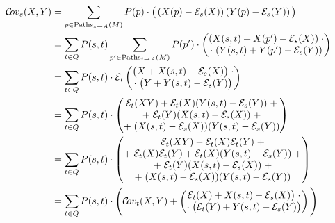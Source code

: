 \documentclass[a4paper]{article}
\theoremstyle{nonumberplain}
\begin{document}
	\begin{align}
	\mathcal{C}\!ov_{s}(X,Y) & = \sum_{p \in \mathrm{Paths}_{s \rightarrow A}(M)}{P(p) \cdot \big(\left(X(p) - \mathcal{E}_{s} (X)\right)\left(Y(p) - \mathcal{E}_{s} (Y)\right)\big)} \\
	& = \sum_{t \in Q}{ P(s,t) \sum_{p' \in \mathrm{Paths}_{t \rightarrow A}(M)}{ P(p') \cdot \begin{pmatrix}
			(X(s,t) + X(p') - \mathcal{E}_{s}(X)) \;\cdot \\
			\cdot \;(Y(s,t) + Y(p') - \mathcal{E}_{s}(Y)) \\
			\end{pmatrix}}} \label{step1} \\
	& = \sum_{t \in Q}{ P(s,t) \cdot \mathcal{E}_{t}\begin{pmatrix}
		\big(X + X(s,t) - \mathcal{E}_{s}(X)\big)\;\cdot \\
		\cdot\;\big(Y + Y(s,t) - \mathcal{E}_{s}(Y)\big) \\
		\end{pmatrix}} \label{step2}\\
	& = \sum_{t \in Q}P(s,t) \cdot \begin{pmatrix}
	\mathcal{E}_{t}(XY) + \mathcal{E}_{t}(X)(Y(s,t) - \mathcal{E}_{s}(Y)) \; + \\
	+\; \mathcal{E}_{t}(Y)(X(s,t) - \mathcal{E}_{s}(X)) \; + \\
	+\; (X(s,t) - \mathcal{E}_{s}(X))(Y(s,t) - \mathcal{E}_{s}(Y)) \\
	\end{pmatrix} \label{step3} \\
	& = \sum_{t \in Q}P(s,t) \cdot \begin{pmatrix}
	\mathcal{E}_{t}(XY) - \mathcal{E}_{t}(X)\mathcal{E}_{t}(Y)\;+ \\
	+\;\mathcal{E}_{t}(X)\mathcal{E}_{t}(Y) + \mathcal{E}_{t}(X)(Y(s,t) - \mathcal{E}_{s}(Y))\;+ \\
	+\; \mathcal{E}_{t}(Y)(X(s,t) - \mathcal{E}_{s}(X))\;+ \\
	+\; (X(s,t) - \mathcal{E}_{s}(X))(Y(s,t) - \mathcal{E}_{s}(Y)) \\
	\end{pmatrix} \label{step4}\\
	& = \sum_{t \in Q}P(s,t) \cdot \Bigg( \mathcal{C}\!ov_{t}(X,Y) + \begin{pmatrix}
	\mathcal{E}_{t}(X) + X(s,t) - \mathcal{E}_{s}(X)\big)\;\cdot \\
	\cdot\;\big(\mathcal{E}_{t}(Y) + Y(s,t) - \mathcal{E}_{s}(Y)\big) \\
	\end{pmatrix}\Bigg) \label{cov_recursive}
	\end{align}
\end{document}
